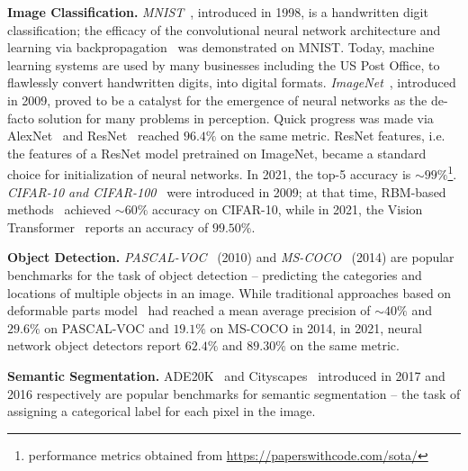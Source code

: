 \begin{description}
    \item \textbf{Image Classification.}
    \textit{MNIST}~\citep{lecun1998mnist}, introduced in 1998, is a handwritten digit classification; the efficacy of the convolutional neural network architecture and learning via backpropagation~\citep{lecun1989backpropagation} was demonstrated on MNIST.
    Today, machine learning systems are used by many businesses including the US Post Office, to flawlessly convert handwritten digits, into digital formats.
    \textit{ImageNet}~\citep{deng2009imagenet}, introduced in 2009, proved to be a catalyst for the emergence of neural networks as the de-facto solution for many problems in perception.
    Quick progress was made via 
    AlexNet~\citep{krizhevsky2012imagenet} and 
    ResNet~\citep{he2016deep} reached $96.4\%$ on the same metric.
    ResNet features, i.e. the features of a ResNet model pretrained on ImageNet, became a standard choice for initialization of neural networks.
    In 2021, the top-5 accuracy is ${\sim}99\%$\footnote{performance metrics obtained from \url{https://paperswithcode.com/sota/}}.
    \textit{CIFAR-10 and CIFAR-100}~\citep{krizhevsky2009learning} were introduced in 2009; at that time, RBM-based methods~\citep{} achieved ${\sim}60\%$ accuracy on CIFAR-10, while in 2021, the Vision Transformer~\citep{} reports an accuracy of $99.50\%$.
\item \textbf{Object Detection.}
    \textit{PASCAL-VOC}~\citep{everingham2010pascal} (2010) and \textit{MS-COCO}~\citep{lin2014microsoft} (2014) are popular benchmarks for the task of object detection -- predicting the categories and locations of multiple objects in an image.
    While traditional approaches based on deformable parts model~\citep{fidler2013bottom} had reached a mean average precision of ${\sim}40\%$ and $29.6\%$ on PASCAL-VOC and $19.1\%$ on MS-COCO in 2014, in 2021, neural network object detectors report $62.4\%$ and $89.30\%$ on the same metric.
\item \textbf{Semantic Segmentation.}
ADE20K~\citep{zhou2017scene} and Cityscapes~\citep{cordts2016cityscapes} introduced in 2017 and 2016 respectively are popular benchmarks for semantic segmentation -- the task of assigning a categorical label for each pixel in the image.

\end{description}
